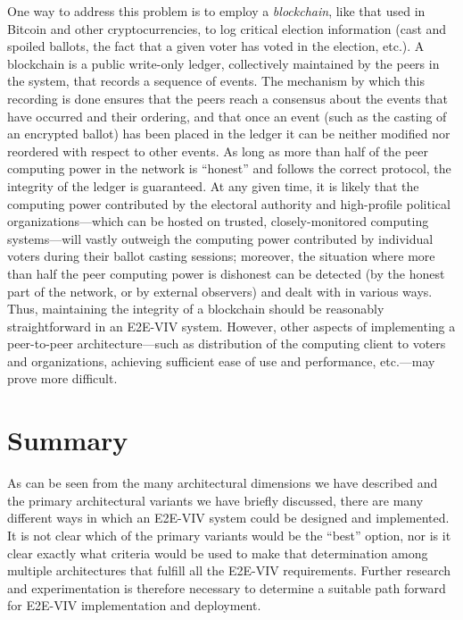 One way to address this problem is to employ a \emph{blockchain}, like
that used in Bitcoin and other cryptocurrencies, to log critical
election information (cast and spoiled ballots, the fact that a given
voter has voted in the election, etc.). A blockchain is a public
write-only ledger, collectively maintained by the peers in the system,
that records a sequence of events. The mechanism by which this
recording is done ensures that the peers reach a consensus about the
events that have occurred and their ordering, and that once an event
(such as the casting of an encrypted ballot) has been placed in the
ledger it can be neither modified nor reordered with respect to other
events. As long as more than half of the peer computing power in the
network is ``honest'' and follows the correct protocol, the integrity
of the ledger is guaranteed. At any given time, it is likely that the
computing power contributed by the electoral authority and
high-profile political organizations---which can be hosted on trusted,
closely-monitored computing systems---will vastly outweigh the
computing power contributed by individual voters during their ballot
casting sessions; moreover, the situation where more than half the
peer computing power is dishonest can be detected (by the honest part
of the network, or by external observers) and dealt with in various
ways. Thus, maintaining the integrity of a blockchain should be
reasonably straightforward in an E2E-VIV system. However, other aspects
of implementing a peer-to-peer architecture---such as distribution of
the computing client to voters and organizations, achieving sufficient
ease of use and performance, etc.---may prove more difficult.

\section{Summary}

As can be seen from the many architectural dimensions we have
described and the primary architectural variants we have briefly
discussed, there are many different ways in which an E2E-VIV system
could be designed and implemented. It is not clear which of the
primary variants would be the ``best'' option, nor is it clear exactly
what criteria would be used to make that determination among multiple
architectures that fulfill all the E2E-VIV requirements. Further
research and experimentation is therefore necessary to determine a
suitable path forward for E2E-VIV implementation and deployment.

